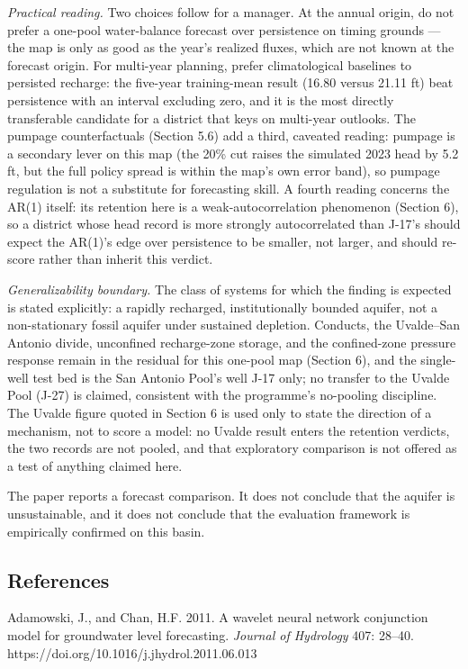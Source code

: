 \documentclass[11pt]{article}
\begin{document}
\emph{Practical reading.} Two choices follow for a manager. At the
annual origin, do not prefer a one-pool water-balance forecast over
persistence on timing grounds --- the map is only as good as the year's
realized fluxes, which are not known at the forecast origin. For
multi-year planning, prefer climatological baselines to persisted
recharge: the five-year training-mean result (16.80 versus 21.11 ft)
beat persistence with an interval excluding zero, and it is the most
directly transferable candidate for a district that keys on multi-year
outlooks. The pumpage counterfactuals (Section 5.6) add a third,
caveated reading: pumpage is a secondary lever on this map (the 20\% cut
raises the simulated 2023 head by 5.2 ft, but the full policy spread is
within the map's own error band), so pumpage regulation is not a
substitute for forecasting skill. A fourth reading concerns the AR(1)
itself: its retention here is a weak-autocorrelation phenomenon (Section
6), so a district whose head record is more strongly autocorrelated than
J-17's should expect the AR(1)'s edge over persistence to be smaller,
not larger, and should re-score rather than inherit this verdict.

\emph{Generalizability boundary.} The class of systems for which the
finding is expected is stated explicitly: a rapidly recharged,
institutionally bounded aquifer, not a non-stationary fossil aquifer
under sustained depletion. Conducts, the Uvalde--San Antonio divide,
unconfined recharge-zone storage, and the confined-zone pressure
response remain in the residual for this one-pool map (Section 6), and
the single-well test bed is the San Antonio Pool's well J-17 only; no
transfer to the Uvalde Pool (J-27) is claimed, consistent with the
programme's no-pooling discipline. The Uvalde figure quoted in Section 6
is used only to state the direction of a mechanism, not to score a
model: no Uvalde result enters the retention verdicts, the two records
are not pooled, and that exploratory comparison is not offered as a test
of anything claimed here.

The paper reports a forecast comparison. It does not conclude that the
aquifer is unsustainable, and it does not conclude that the evaluation
framework is empirically confirmed on this basin.

\subsection{References}\label{references}

Adamowski, J., and Chan, H.F. 2011. A wavelet neural network conjunction
model for groundwater level forecasting. \emph{Journal of Hydrology}
407: 28--40. https://doi.org/10.1016/j.jhydrol.2011.06.013
\end{document}
